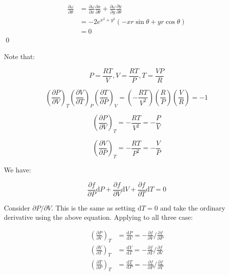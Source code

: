 \documentclass[12pt]{article}
\begin{document}
\begin{equation}
    \begin{split}
        \frac{\partial \omega}{\partial \theta} &= \frac{\partial \omega}{\partial x} \frac{\partial x}{\partial \theta} + \frac{\partial \omega}{\partial y} \frac{\partial y}{\partial \theta} \\
        &= -2e^{x^{2} + y^{2}} (-xr \sin{\theta} + yr \cos{\theta})\\
        &= 0
    \end{split}
\end{equation}
\qed


Note that:

\begin{equation}
    P = \frac{RT}{V}, V = \frac{RT}{P}, T = \frac{VP}{R}
\end{equation}


\begin{equation}
    \left( \frac{\partial P}{\partial V} \right)_{T} \left( \frac{\partial V}{\partial T} \right)_{P} \left( \frac{\partial T}{\partial P} \right)_{V} = \left( -\frac{RT}{V^{2}} \right) \left( \frac{R}{P} \right) \left( \frac{V}{R} \right) = -1
\end{equation}

\begin{equation}
    \left( \frac{\partial P}{\partial V} \right)_{T} = -\frac{RT}{V^{2}} = -\frac{P}{V}
\end{equation}

\begin{equation}
    \left( \frac{\partial V}{\partial P} \right)_{T} = -\frac{RT}{P^{2}} = -\frac{V}{P}
\end{equation}

We have:

\begin{equation}
    \frac{\partial f}{\partial P} \mathrm{d}P + \frac{\partial f}{\partial V} \mathrm{d}V + \frac{\partial f}{\partial T} \mathrm{d}T = 0
\end{equation}

Consider $\partial P/\partial V$. This is the same as setting $\mathrm{d}T = 0$ and take the ordinary derivative using the above equation. Applying to all three case:

\begin{equation}
    \begin{split}
        \left( \frac{\partial P}{\partial V} \right)_{T} &= \frac{\mathrm{d}P}{\mathrm{d}V} = - \frac{\partial f}{\partial V}/\frac{\partial f}{\partial P} \\
        \left( \frac{\partial V}{\partial T} \right)_{T} &= \frac{\mathrm{d}V}{\mathrm{d}T} = - \frac{\partial f}{\partial T}/\frac{\partial f}{\partial V} \\
        \left( \frac{\partial T}{\partial P} \right)_{T} &= \frac{\mathrm{d}T}{\mathrm{d}P} = - \frac{\partial f}{\partial P}/\frac{\partial f}{\partial T}
    \end{split}
\end{equation}
\end{document}
